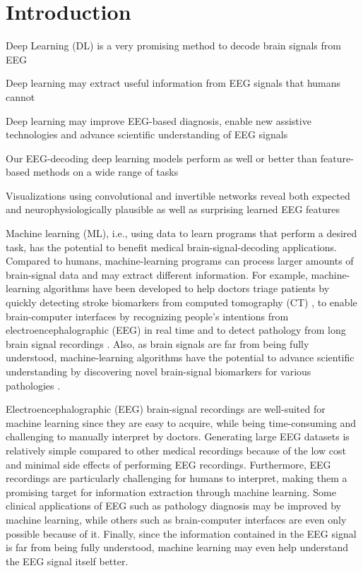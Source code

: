 \chapter{Introduction}\label{introduction}

\begin{startbox}{Deep Learning (DL) is a very promising method to decode brain signals from EEG}
\item Deep learning may extract useful information from EEG signals that humans cannot
\item Deep learning may improve EEG-based diagnosis, enable new assistive technologies and advance scientific understanding of EEG signals
\item Our EEG-decoding deep learning models perform as well or better than feature-based methods on a wide range of tasks
\item Visualizations using convolutional and invertible networks reveal both expected and neurophysiologically plausible as well as surprising learned EEG features
\end{startbox}


Machine learning (ML), i.e., using data to learn programs that perform a
desired task, has the potential to benefit medical brain-signal-decoding
applications. Compared to humans, machine-learning programs can process
larger amounts of brain-signal data and may extract different
information. For example, machine-learning algorithms have been
developed to help doctors triage patients by quickly detecting stroke
biomarkers from computed tomography (CT)
\citep{chavva2022deep}, to enable brain-computer interfaces
by recognizing people's intentions from electroencephalographic (EEG) in
real time \citep{abiri2019comprehensive} and to detect
pathology from long brain signal recordings
\citep{gemein2020machine,schirrmeisterdeeppathology}. Also,
as brain signals are far from being fully understood, machine-learning
algorithms have the potential to advance scientific understanding by
discovering novel brain-signal biomarkers for various pathologies
\citep{raghu2020survey}.



    Electroencephalographic (EEG) brain-signal recordings are well-suited
for machine learning since they are easy to acquire, while being
time-consuming and challenging to manually interpret by doctors.
Generating large EEG datasets is relatively simple compared to other
medical recordings because of the low cost and minimal side effects of
performing EEG recordings. Furthermore, EEG recordings are particularly
challenging for humans to interpret, making them a promising target for
information extraction through machine learning. Some clinical
applications of EEG such as pathology diagnosis may be improved by
machine learning, while others such as brain-computer interfaces are
even only possible because of it. Finally, since the information
contained in the EEG signal is far from being fully understood, machine
learning may even help understand the EEG signal itself better.

